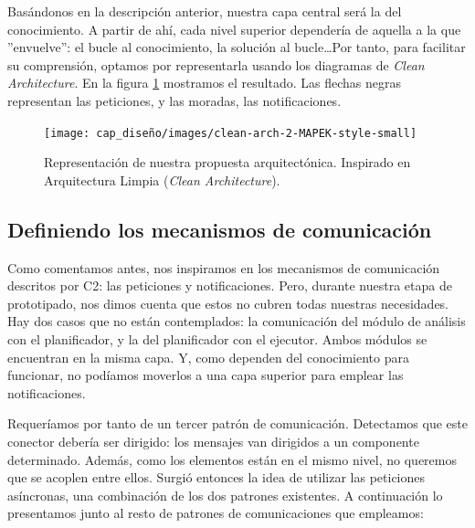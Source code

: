 Basándonos en la descripción anterior, nuestra capa central será la del conocimiento. A partir de ahí, cada nivel superior dependería de aquella a la que ''envuelve'': el bucle al conocimiento, la solución al bucle\dots Por tanto, para facilitar su comprensión, optamos por representarla usando los diagramas de \emph{Clean Architecture}. En la figura \ref{fig:clean-mapek-architecture} mostramos el resultado. Las flechas negras representan las peticiones, y las moradas, las notificaciones.

\begin{figure}[htb]
  \centering
  \texttt{[image: cap\_diseño/images/clean-arch-2-MAPEK-style-small]}
  \caption[Representación de nuestra propuesta arquitectónica. Inspirado en Arquitectura Limpia (\emph{Clean Architecture}).]{Representación de nuestra propuesta arquitectónica. Inspirado en Arquitectura Limpia (\emph{Clean Architecture}). \footnotemark }
  \label{fig:clean-mapek-architecture}
\end{figure}


\subsection{Definiendo los mecanismos de comunicación}

Como comentamos antes, nos inspiramos en los mecanismos de comunicación descritos por C2: las peticiones y notificaciones. Pero, durante nuestra etapa de prototipado, nos dimos cuenta que estos no cubren todas nuestras necesidades. Hay dos casos que no están contemplados: la comunicación del módulo de análisis con el planificador, y la del planificador con el ejecutor. Ambos módulos se encuentran en la misma capa. Y, como dependen del conocimiento para funcionar, no podíamos moverlos a una capa superior para emplear las notificaciones.

Requeríamos por tanto de un tercer patrón de comunicación. Detectamos que este conector debería ser dirigido: los mensajes van dirigidos a un componente determinado. Además, como los elementos están en el mismo nivel, no queremos que se acoplen entre ellos. Surgió entonces la idea de utilizar las peticiones asíncronas, una combinación de los dos patrones existentes. A continuación lo presentamos junto al resto de patrones de comunicaciones que empleamos:

